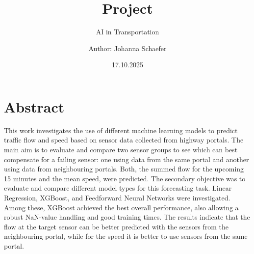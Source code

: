 



	\title{Project}
	\subtitle{AI in Transportation}
	\author{Author: Johanna Schaefer}
	\date{17.10.2025}
	\maketitle
	\vspace{3cm}
	
	\thispagestyle{empty}	%
	
	\section*{Abstract}
	This work investigates the use of different machine learning models to predict traffic flow and speed based on sensor data collected from highway portals.
	The main aim is to evaluate and compare two sensor groups to see which can best compensate for a failing sensor: one using data from the same portal and another using data from neighbouring portals. 
	Both, the summed flow for the upcoming 15 minutes and the mean speed, were predicted.
	The secondary objective was to evaluate and compare different model types for this forecasting task. Linear Regression, XGBoost, and Feedforward Neural Networks were investigated. Among these, XGBoost achieved the best overall performance, also allowing a robust NaN-value handling and good training times.
	The results indicate that the flow at the target sensor can be better predicted with the sensors from the neighbouring portal, while for the speed it is better to use sensors from the same portal.
	
	

	
	
	
	\thispagestyle{empty}
	\cleardoublepage
	\thispagestyle{empty}




	\newpage
	\tableofcontents
	\thispagestyle{empty}	%

